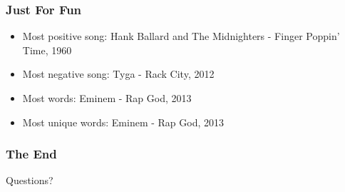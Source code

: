 \documentclass[10pt]{beamer}
\begin{document}
\begin{frame}
    \frametitle{Just For Fun}
    \begin{itemize}
        \item Most positive song: Hank Ballard and The Midnighters - Finger Poppin' Time, 1960
        \item Most negative song: Tyga - Rack City, 2012
        \item Most words: Eminem - Rap God, 2013
        \item Most unique words: Eminem - Rap God, 2013
    \end{itemize}
\end{frame}
\begin{frame}
\frametitle{The End}

\LARGE{\centerline{Questions?}}

\end{frame}

\end{document}
